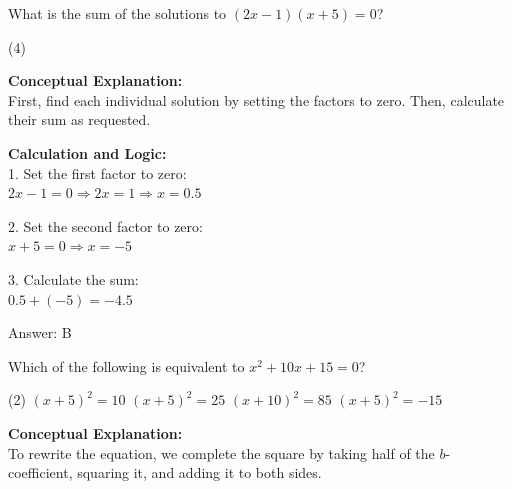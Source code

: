 \documentclass[11pt,paper=a4,answers]{exam}
\begin{document}
\begin{questions}
\vspace{30pt}

\question
What is the sum of the solutions to $(2x - 1)(x + 5) = 0$?
\begin{tasks}(4)
\end{tasks}

\begin{solution}
\textbf{Conceptual Explanation:} \\
First, find each individual solution by setting the factors to zero. Then, calculate their sum as requested.

\vspace{15pt}

\textbf{Calculation and Logic:} \\
1. Set the first factor to zero: \\
   $2x - 1 = 0 \Rightarrow 2x = 1 \Rightarrow x = 0.5$

\vspace{10pt}

2. Set the second factor to zero: \\
   $x + 5 = 0 \Rightarrow x = -5$

\vspace{10pt}

3. Calculate the sum: \\
   $0.5 + (-5) = -4.5$

\vspace{20pt}

Answer: \colorbox{yellow!100}{B}
\end{solution}

\vspace{30pt}

\question
Which of the following is equivalent to $x^2 + 10x + 15 = 0$?
\begin{tasks}(2)
    \task $(x + 5)^2 = 10$
    \task $(x + 5)^2 = 25$
    \task $(x + 10)^2 = 85$
    \task $(x + 5)^2 = -15$
\end{tasks}

\begin{solution}
\textbf{Conceptual Explanation:} \\
To rewrite the equation, we complete the square by taking half of the $b$-coefficient, squaring it, and adding it to both sides.

\vspace{15pt}


\end{solution}
\end{questions}
\end{document}
